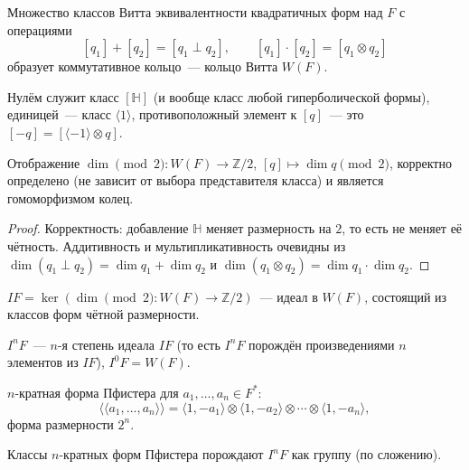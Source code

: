 \documentclass[12pt]{article}
\begin{document}
	\begin{definition}
		Множество классов Витта эквивалентности квадратичных форм над $F$ с операциями
		\[
		[q_1] + [q_2] = [q_1 \perp q_2], \qquad [q_1] \cdot [q_2] = [q_1 \otimes q_2]
		\]
		образует коммутативное кольцо~--- кольцо Витта $W(F)$.
		
		Нулём служит класс $[\mathbb{H}]$ (и вообще класс любой гиперболической формы), единицей~--- класс $\langle 1 \rangle$, противоположный элемент к $[q]$~--- это $[-q] = [\langle -1 \rangle \otimes q]$.
	\end{definition}
	
	\begin{statement}
		Отображение $\dim \pmod 2 : W(F) \rightarrow \mathbb{Z}/2$, $[q] \mapsto \dim q \pmod 2$, корректно определено (не зависит от выбора представителя класса) и является гомоморфизмом колец.
	\end{statement}
	
	\begin{proof}
		Корректность: добавление $\mathbb{H}$ меняет размерность на $2$, то есть не меняет её чётность. Аддитивность и мультипликативность очевидны из $\dim(q_1 \perp q_2) = \dim q_1 + \dim q_2$ и $\dim(q_1 \otimes q_2) = \dim q_1 \cdot \dim q_2$.
	\end{proof}
	
	\begin{definition}
		$IF = \ker \left( \dim \pmod 2 : W(F) \rightarrow \mathbb{Z}/2 \right)$~--- идеал в $W(F)$, состоящий из классов форм чётной размерности.
	\end{definition}
	
	\begin{definition}
		$I^n F$~--- $n$-я степень идеала $IF$ (то есть $I^n F$ порождён произведениями $n$ элементов из $IF$), $I^0 F = W(F)$.
	\end{definition}
	
	\begin{definition}
		$n$-кратная форма Пфистера для $a_1, \dots, a_n \in F^*$:
		\[
		\langle\langle a_1, \dots, a_n \rangle\rangle = \langle 1, -a_1 \rangle \otimes \langle 1, -a_2 \rangle \otimes \cdots \otimes \langle 1, -a_n \rangle,
		\]
		форма размерности $2^n$.
	\end{definition}
	
	\begin{statement}
		Классы $n$-кратных форм Пфистера порождают $I^n F$ как группу (по сложению).
	\end{statement}
	
\end{document}
